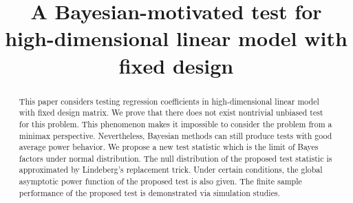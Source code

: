 \documentclass[bj]{imsart}
\theoremstyle{plain}
\theoremstyle{definition}
\theoremstyle{remark}
\begin{document}
\begin{frontmatter}

\title{
A Bayesian-motivated test for high-dimensional linear model with fixed design
}


\begin{aug}
    \author{ }
    \author{ \corref{}}
 \address[a]{
     School of Mathematics and Statistics, Beijing Institute of Technology, Beijing 100081,China.
 }

 \address[b]{
     Beijing Key Laboratory on MCAACI, Beijing Institute of Technology, Beijing 100081,China.
}



\end{aug}

\begin{abstract}
This paper considers testing regression coefficients in high-dimensional linear model with fixed design matrix.
    We prove that there does not exist nontrivial unbiased test for this problem.
    This phenomenon makes it impossible to consider the problem from a minimax perspective.
    Nevertheless, Bayesian methods can still produce tests with good average power behavior.
    We propose a new test statistic which is the limit of Bayes factors under normal distribution.
    The null distribution of the proposed test statistic is approximated by Lindeberg's replacement trick.
    Under certain conditions, the global asymptotic power function of the proposed test is also given.
    The finite sample performance of the proposed test is demonstrated via simulation studies.
\end{abstract}


\begin{keyword}
\end{keyword}


\end{frontmatter}
\end{document}
